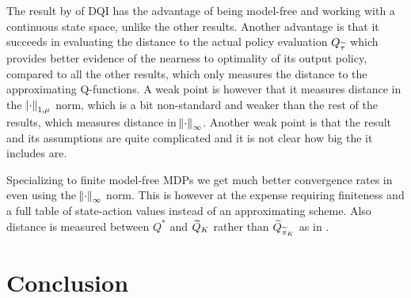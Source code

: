 The result by  of DQI has the advantage of being model-free
and working with a continuous state space, unlike the other results.
Another advantage is that it succeeds in evaluating the distance to the
actual policy evaluation $Q_{\widetilde{\tau}}$ which provides better evidence
of the nearness to optimality of its output policy, compared to all the
other results, which only measures the distance to the approximating
Q-functions.
A weak point is however that it measures distance in the $\norm{\cdot}_{1, \mu}$
norm, which is a bit non-standard and weaker than the rest of the results,
which measures distance in $\norm{\cdot}_\infty$.
Another weak point is that the result and its assumptions are
quite complicated and it is not clear how big the it includes
are.

Specializing to finite model-free MDPs we get much better convergence rates
in  even using the $\norm{\cdot}_\infty$ norm.
This is however at the expense requiring finiteness and
a full table of state-action values instead of an approximating scheme.
Also distance is measured between $Q^*$ and $\widetilde{Q}_K$ rather than
$\widetilde{Q}_{\widetilde{\pi}_K}$ as in .

\section{Conclusion}

